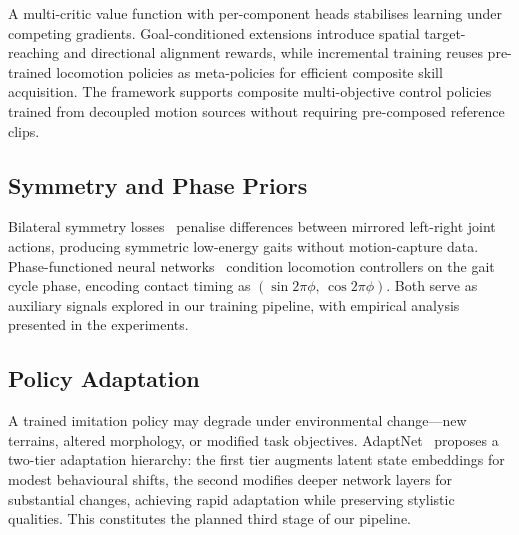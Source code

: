 A multi-critic value function with per-component heads stabilises learning under competing gradients. Goal-conditioned extensions introduce spatial target-reaching and directional alignment rewards, while incremental training reuses pre-trained locomotion policies as meta-policies for efficient composite skill acquisition. The framework supports composite multi-objective control policies trained from decoupled motion sources without requiring pre-composed reference clips.

\subsection{Symmetry and Phase Priors}

Bilateral symmetry losses~\cite{symlocom2018} penalise differences between mirrored left-right joint actions, producing symmetric low-energy gaits without motion-capture data. Phase-functioned neural networks~\cite{phasefunc2017} condition locomotion controllers on the gait cycle phase, encoding contact timing as $(\sin 2\pi\phi,\, \cos 2\pi\phi)$. Both serve as auxiliary signals explored in our training pipeline, with empirical analysis presented in the experiments.

\subsection{Policy Adaptation}

A trained imitation policy may degrade under environmental change---new terrains, altered morphology, or modified task objectives. AdaptNet~\cite{adaptnet2023} proposes a two-tier adaptation hierarchy: the first tier augments latent state embeddings for modest behavioural shifts, the second modifies deeper network layers for substantial changes, achieving rapid adaptation while preserving stylistic qualities. This constitutes the planned third stage of our pipeline.
